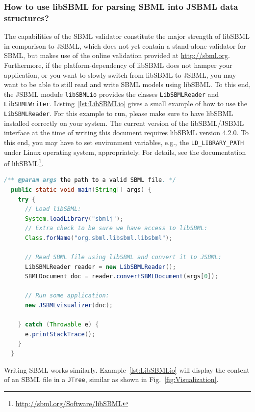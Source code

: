 \subsubsection{How to use libSBML for parsing SBML into JSBML data structures?}

The capabilities of the SBML validator constitute the
major strength of libSBML \citep{Bornstein2008} in comparison to JSBML, which
does not yet contain a stand-alone validator for SBML, but makes use of the
online validation provided at \url{http://sbml.org}. Furthermore, if the
platform-dependency of libSBML does not hamper your application, or you want to
slowly switch from libSBML to JSBML, you may want to be able to still read and
write SBML models using libSBML. To this end, the JSBML module
\texttt{libSBMLio} provides the classes \texttt{LibSBMLReader}
%
and \texttt{LibSBMLWriter}.
%
Listing~\vref{lst:LibSBMLio} gives a small example of how to use the
\texttt{LibSBMLReader}. For this example to run, please make sure to have
libSBML installed correctly on your system. The current version of the
libSBML/JSBML interface at the time of writing this document requires libSBML
version 4.2.0.
%
To this end, you may have to set environment variables, e.g., the
\texttt{LD\_LIBRARY\_PATH}
%
under Linux operating system, appropriately. For
details, see the documentation of
libSBML\footnote{\url{http://sbml.org/Software/libSBML}}.
\begin{lstlisting}[language=Java,float,caption={A simple example for
converting libSBML data structures into JSBML data objects},label=lst:LibSBMLio]
  /** @param args the path to a valid SBML file. */
  public static void main(String[] args) {
    try {
      // Load libSBML:
      System.loadLibrary("sbmlj");
      // Extra check to be sure we have access to libSBML:
      Class.forName("org.sbml.libsbml.libsbml");

      // Read SBML file using libSBML and convert it to JSBML:
      LibSBMLReader reader = new LibSBMLReader();
      SBMLDocument doc = reader.convertSBMLDocument(args[0]);

      // Run some application:
      new JSBMLvisualizer(doc);

    } catch (Throwable e) {
      e.printStackTrace();
    }
  }
\end{lstlisting}
Writing SBML works similarly. Example~\vref{lst:LibSBMLio} will display the
content of an SBML file in a \texttt{JTree}, similar as shown in
Fig.~\vref{fig:Visualization}.

